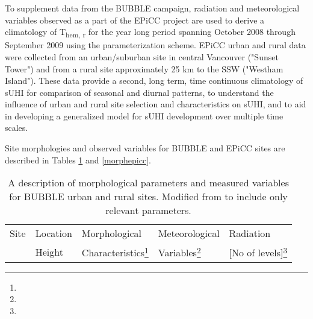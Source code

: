 \begin{bibunit}
To supplement data from the BUBBLE campaign, radiation and meteorological variables observed as a part of the EPiCC project are used to derive a climatology of T\textsubscript{hem, r} for the year long period spanning October 2008 through September 2009 using the parameterization scheme. EPiCC urban and rural data were collected from an urban/suburban site in central Vancouver ("Sunset Tower") and from a rural site approximately 25 \si{\kilo\meter} to the SSW ("Westham Island"). These data provide a second, long term, time continuous climatology of sUHI for comparison of seasonal and diurnal patterns, to understand the influence of urban and rural site selection and characteristics on sUHI, and to aid in developing a generalized model for sUHI development over multiple time scales. 

Site morphologies and observed variables for BUBBLE and EPiCC sites are described in Tables \ref{morphbspr} and \ref{morphepicc}.

\begin{table}[H]
	\centering
	\caption{A description of morphological parameters and measured variables for BUBBLE urban and rural sites. Modified from \citet{Rotach2005} to include only relevant parameters.}
	\label{morphbspr}
	\begin{tabular*}{\textwidth}{p{3.75cm} p{2.25cm}p{3.5cm}p{2.75cm}p{2.75cm}}
		\toprule 
		Site & Location & Morphological & Meteorological & Radiation \\ 
		& Height & Characteristics\footnote{} & Variables\footnote{} & [No of levels]\footnote{} \\ 	\midrule
		

\end{tabular*}
\end{table}
\end{bibunit}
